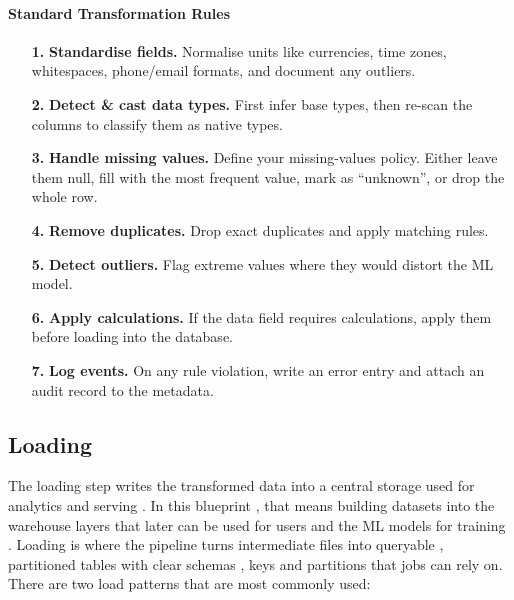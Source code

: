 \paragraph{Standard Transformation Rules}
\begin{enumerate}
  \item[\textbf{1.}] \textbf{Standardise fields.} Normalise units like currencies, time zones, whitespaces, phone/email formats, and document any outliers.
  \item[\textbf{2.}] \textbf{Detect \& cast data types.} First infer base types, then re-scan the columns to classify them as native types.
  \item[\textbf{3.}] \textbf{Handle missing values.} Define your missing-values policy. Either leave them null, fill with the most frequent value, mark as ``unknown'', or drop the whole row.
  \item[\textbf{4.}] \textbf{Remove duplicates.} Drop exact duplicates and apply matching rules.
  \item[\textbf{5.}] \textbf{Detect outliers.} Flag extreme values where they would distort the ML model.
  \item[\textbf{6.}] \textbf{Apply calculations.} If the data field requires calculations, apply them before loading into the database.
  \item[\textbf{7.}] \textbf{Log events.} On any rule violation, write an error entry and attach an audit record to the metadata.
\end{enumerate}

\subsection{Loading}
\label{sec:load_patterns}
The loading step writes the transformed data into a central storage used for analytics and serving . In this blueprint , that means building datasets into the warehouse layers that later can be used for users and the ML models for training . Loading is where the pipeline turns intermediate files into queryable , partitioned tables with clear schemas , keys and partitions that jobs can rely on\cite{burgos:2022}. There are two load patterns that are most commonly used:




